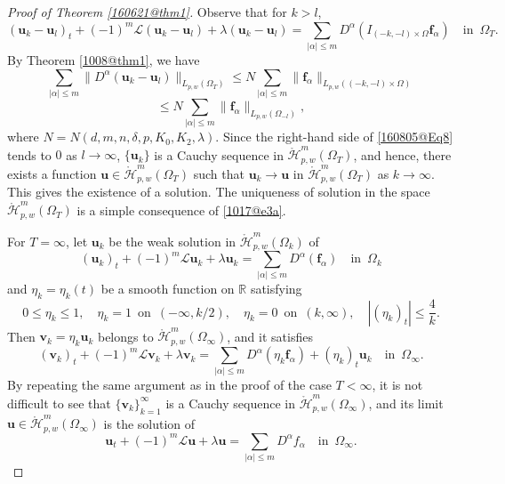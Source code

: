 \documentclass[reqno]{amsart}
\numberwithin{equation}{section}
\theoremstyle{plain}
\theoremstyle{definition}
\theoremstyle{remark}
\begin{document}
\begin{proof}[Proof of Theorem \ref{160621@thm1}]
Observe that for $k>l$, 
$$
({\boldsymbol{u}}_k-{\boldsymbol{u}}_l)_t+(-1)^m{\mathcal{L}}({\boldsymbol{u}}_k-{\boldsymbol{u}}_l)+\lambda({\boldsymbol{u}}_k-{\boldsymbol{u}}_l)=\sum_{|\alpha|\le m}D^\alpha(I_{(-k,-l)\times \Omega}{\boldsymbol{f}}_\alpha) \quad \text{in }\, \Omega_T.
$$
By Theorem \ref{1008@thm1}, we have 
$$
\sum_{|\alpha|\le m}\|D^\alpha ({\boldsymbol{u}}_k-{\boldsymbol{u}}_l)\|_{L_{p,w}(\Omega_T)}\le N\sum_{|\alpha|\le m}\|{\boldsymbol{f}}_\alpha\|_{L_{p,w}((-k,-l)\times \Omega)}
$$
\begin{equation}		\label{160805@Eq8}
\le N\sum_{|\alpha|\le m}\|{\boldsymbol{f}}_\alpha\|_{L_{p,w}(\Omega_{-l})},
\end{equation}
where $N=N(d,m,n,\delta,p,K_0,K_2,\lambda)$.
Since the right-hand side of \eqref{160805@Eq8} tends to $0$ as $l\to \infty$, $\{{\boldsymbol{u}}_k\}$ is a Cauchy sequence in $\mathring{\mathcal{H}}^m_{p,w}(\Omega_T)$, and hence, there exists a function ${\boldsymbol{u}}\in \mathring{\mathcal{H}}^m_{p,w}(\Omega_T)$ such that 
${\boldsymbol{u}}_k \to {\boldsymbol{u}}$ in $ \mathring{\mathcal{H}}^m_{p,w}(\Omega_T)$ as $k\to \infty$.
This gives the existence of a solution.
The uniqueness of  solution
in the space  $\mathring{\mathcal{H}}^m_{p,w}(\Omega_T)$ is a simple consequence of \eqref{1017@e3a}.

For $T=\infty$, 
let ${\boldsymbol{u}}_{k}$ be the weak solution in $\mathring{\mathcal{H}}^m_{p,w}(\Omega_k)$ of 
$$
({\boldsymbol{u}}_k)_t+(-1)^m{\mathcal{L}} {\boldsymbol{u}}_k+\lambda{\boldsymbol{u}}_k=\sum_{|\alpha|\le m}D^\alpha ({\boldsymbol{f}}_\alpha ) \quad \text{in }\, \Omega_k
$$
and $\eta_k=\eta_k(t)$ be a smooth function on ${\mathbb{R}}$ satisfying
$$
0\le \eta_k\le 1, \quad \eta_k= 1  \, \text{ on } \, (-\infty,k/2), \quad \eta_k= 0 \, \text{ on }\, (k, \infty), \quad |(\eta_k)_t|\le \frac{4}{k}.
$$
Then ${\boldsymbol{v}}_k=\eta_k{\boldsymbol{u}}_k$
belongs to $\mathring{\mathcal{H}}^m_{p,w}(\Omega_\infty)$, and it satisfies 
$$
({\boldsymbol{v}}_k)_t+(-1)^m{\mathcal{L}} {\boldsymbol{v}}_k+\lambda {\boldsymbol{v}}_k=\sum_{|\alpha|\le m}D^\alpha(\eta_k {\boldsymbol{f}}_\alpha)+(\eta_k)_t{\boldsymbol{u}}_k \quad \text{in }\, \Omega_\infty.
$$
By repeating the same argument as in the proof of the case $T<\infty$, it is not difficult to see that $\{{\boldsymbol{v}}_k\}_{k=1}^\infty$ is a Cauchy sequence in $\mathring{\mathcal{H}}^m_{p,w}(\Omega_\infty)$, and its limit ${\boldsymbol{u}}\in \mathring{\mathcal{H}}^m_{p,w}(\Omega_\infty)$ is the solution of 
$$
{\boldsymbol{u}}_t+(-1)^m{\mathcal{L}}{\boldsymbol{u}}+\lambda{\boldsymbol{u}}=\sum_{|\alpha|\le m}D^\alpha f_\alpha \quad \text{in }\, \Omega_\infty.
$$


\end{proof}
\end{document}

